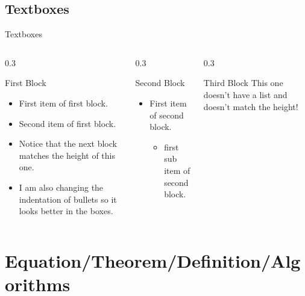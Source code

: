 \documentclass[
	10pt, %
	aspectratio=169, %
]{beamer}
\begin{document}
\subsection{Textboxes}
\begin{frame}{Textboxes}
	\centering
	\begin{columns}[T]
		\begin{column}{0.3\textwidth}
			\begin{primaryblock}[equal height group=A,label=block:first]{First Block}
				\setlength{\leftmargini}{8pt}
				\begin{itemize}
					\item First item of first block.
					\item Second item of first block.
					\item Notice that the next block matches the height of this one.
					\item I am also changing the indentation of bullets so it looks better in the boxes.
				\end{itemize}
			\end{primaryblock}
		\end{column}
		\begin{column}{0.3\textwidth}
			\begin{secondaryblock}[equal height group=A]{Second Block}
				\setlength{\leftmargini}{8pt}
				\begin{itemize}
					\item First item of second block.
					      \begin{itemize}
						      \item first sub item of second block.
					      \end{itemize}
				\end{itemize}
			\end{secondaryblock}
		\end{column}
		\begin{column}{0.3\textwidth}
			\begin{primaryblock}[]{Third Block}
				This one doesn't have a list and doesn't match the height!
			\end{primaryblock}
		\end{column}
	\end{columns}
\end{frame}

\section{Equation/Theorem/Definition/Algorithms}
\end{document}
